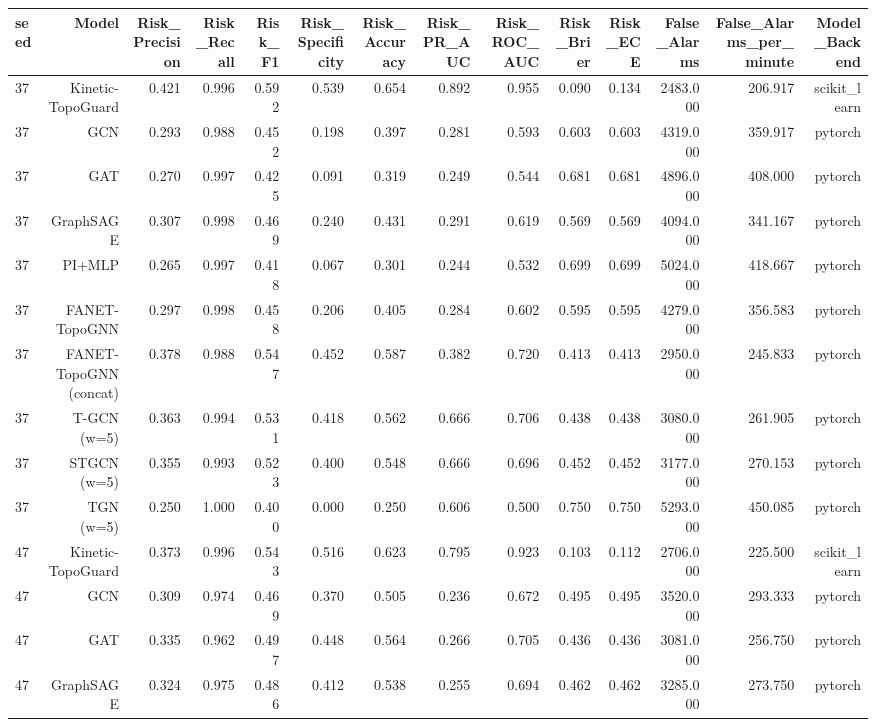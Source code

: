 \begin{tabular}{lrrrrrrrrrrrrr}
\toprule
seed & Model & Risk\_Precision & Risk\_Recall & Risk\_F1 & Risk\_Specificity & Risk\_Accuracy & Risk\_PR\_AUC & Risk\_ROC\_AUC & Risk\_Brier & Risk\_ECE & False\_Alarms & False\_Alarms\_per\_minute & Model\_Backend \\
\midrule
37 & Kinetic-TopoGuard & 0.421 & 0.996 & 0.592 & 0.539 & 0.654 & 0.892 & 0.955 & 0.090 & 0.134 & 2483.000 & 206.917 & scikit\_learn \\
37 & GCN & 0.293 & 0.988 & 0.452 & 0.198 & 0.397 & 0.281 & 0.593 & 0.603 & 0.603 & 4319.000 & 359.917 & pytorch \\
37 & GAT & 0.270 & 0.997 & 0.425 & 0.091 & 0.319 & 0.249 & 0.544 & 0.681 & 0.681 & 4896.000 & 408.000 & pytorch \\
37 & GraphSAGE & 0.307 & 0.998 & 0.469 & 0.240 & 0.431 & 0.291 & 0.619 & 0.569 & 0.569 & 4094.000 & 341.167 & pytorch \\
37 & PI+MLP & 0.265 & 0.997 & 0.418 & 0.067 & 0.301 & 0.244 & 0.532 & 0.699 & 0.699 & 5024.000 & 418.667 & pytorch \\
37 & FANET-TopoGNN & 0.297 & 0.998 & 0.458 & 0.206 & 0.405 & 0.284 & 0.602 & 0.595 & 0.595 & 4279.000 & 356.583 & pytorch \\
37 & FANET-TopoGNN (concat) & 0.378 & 0.988 & 0.547 & 0.452 & 0.587 & 0.382 & 0.720 & 0.413 & 0.413 & 2950.000 & 245.833 & pytorch \\
37 & T-GCN (w=5) & 0.363 & 0.994 & 0.531 & 0.418 & 0.562 & 0.666 & 0.706 & 0.438 & 0.438 & 3080.000 & 261.905 & pytorch \\
37 & STGCN (w=5) & 0.355 & 0.993 & 0.523 & 0.400 & 0.548 & 0.666 & 0.696 & 0.452 & 0.452 & 3177.000 & 270.153 & pytorch \\
37 & TGN (w=5) & 0.250 & 1.000 & 0.400 & 0.000 & 0.250 & 0.606 & 0.500 & 0.750 & 0.750 & 5293.000 & 450.085 & pytorch \\
47 & Kinetic-TopoGuard & 0.373 & 0.996 & 0.543 & 0.516 & 0.623 & 0.795 & 0.923 & 0.103 & 0.112 & 2706.000 & 225.500 & scikit\_learn \\
47 & GCN & 0.309 & 0.974 & 0.469 & 0.370 & 0.505 & 0.236 & 0.672 & 0.495 & 0.495 & 3520.000 & 293.333 & pytorch \\
47 & GAT & 0.335 & 0.962 & 0.497 & 0.448 & 0.564 & 0.266 & 0.705 & 0.436 & 0.436 & 3081.000 & 256.750 & pytorch \\
47 & GraphSAGE & 0.324 & 0.975 & 0.486 & 0.412 & 0.538 & 0.255 & 0.694 & 0.462 & 0.462 & 3285.000 & 273.750 & pytorch \\

\end{tabular}
